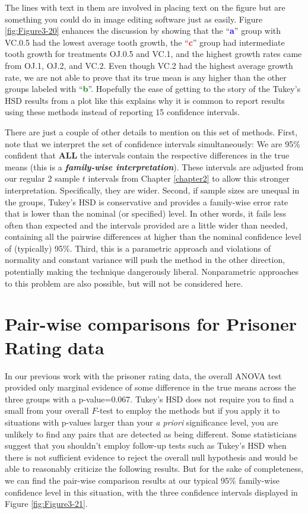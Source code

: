 \documentclass[]{book}
\theoremstyle{definition}
\theoremstyle{definition}
\theoremstyle{remark}
\begin{document}
The lines with text in them are involved in placing text on the figure
but are something you could do in image editing software just as easily.
Figure \ref{fig:Figure3-20} enhances the discussion by showing that the
``\textcolor{blue}{\textbf{a}}'' group with VC.0.5 had the lowest
average tooth growth, the ``\textcolor{red}{\textbf{c}}'' group had
intermediate tooth growth for treatments OJ.0.5 and VC.1, and the
highest growth rates came from OJ.1, OJ.2, and VC.2. Even though VC.2
had the highest average growth rate, we are not able to prove that its
true mean is any higher than the other groups labeled with
``\textcolor{green}{\textbf{b}}''. Hopefully the ease of getting to the
story of the Tukey's HSD results from a plot like this explains why it
is common to report results using these methods instead of reporting 15
confidence intervals.

There are just a couple of other details to mention on this set of
methods. First, note that we interpret the set of confidence intervals
simultaneously: We are 95\% confident that \textbf{ALL} the intervals
contain the respective differences in the true means (this is a
\textbf{\emph{family-wise interpretation}}). These intervals are
adjusted from our regular 2 sample \(t\) intervals from Chapter
\ref{chapter2} to allow this stronger interpretation. Specifically, they
are wider. Second, if sample sizes are unequal in the groups, Tukey's
HSD is conservative and provides a family-wise error rate that is lower
than the nominal (or specified) level. In other words, it fails less
often than expected and the intervals provided are a little wider than
needed, containing all the pairwise differences at higher than the
nominal confidence level of (typically) 95\%. Third, this is a
parametric approach and violations of normality and constant variance
will push the method in the other direction, potentially making the
technique dangerously liberal. Nonparametric approaches to this problem
are also possible, but will not be considered here.

\section{Pair-wise comparisons for Prisoner Rating
data}\label{section3-7}

In our previous work with the prisoner rating data, the overall ANOVA
test provided only marginal evidence of some difference in the true
means across the three groups with a p-value=0.067. Tukey's HSD does not
require you to find a small from your overall \(F\)-test to employ the
methods but if you apply it to situations with p-values larger than your
\emph{a priori} significance level, you are unlikely to find any pairs
that are detected as being different. Some statisticians suggest that
you shouldn't employ follow-up tests such as Tukey's HSD when there is
not sufficient evidence to reject the overall null hypothesis and would
be able to reasonably criticize the following results. But for the sake
of completeness, we can find the pair-wise comparison results at our
typical 95\% family-wise confidence level in this situation, with the
three confidence intervals displayed in Figure \ref{fig:Figure3-21}.
\end{document}
